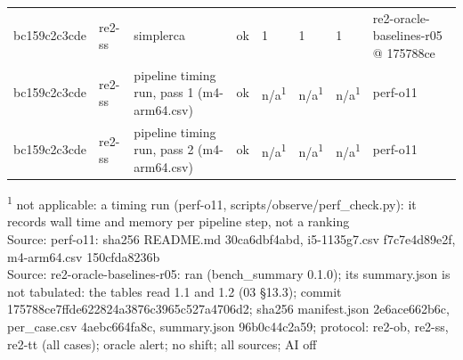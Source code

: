 \begin{table}[t]
\begin{tabular}{llllllll}
bc159c2c3cde & re2-ss & simplerca & ok & 1 & 1 & 1 & re2-oracle-baselines-r05 @ 175788ce \\
bc159c2c3cde & re2-ss & pipeline timing run, pass 1 (m4-arm64.csv) & ok & n/a\textsuperscript{1} & n/a\textsuperscript{1} & n/a\textsuperscript{1} & perf-o11 \\
bc159c2c3cde & re2-ss & pipeline timing run, pass 2 (m4-arm64.csv) & ok & n/a\textsuperscript{1} & n/a\textsuperscript{1} & n/a\textsuperscript{1} & perf-o11 \\
\hline
\end{tabular}
\par\smallskip\footnotesize
\textsuperscript{1} not applicable: a timing run (perf-o11, scripts/observe/perf\_check.py): it records wall time and memory per pipeline step, not a ranking\\
Source: perf-o11: sha256 README.md 30ca6dbf4abd, i5-1135g7.csv f7c7e4d89e2f, m4-arm64.csv 150cfda8236b\\
Source: re2-oracle-baselines-r05: ran (bench\_summary 0.1.0); its summary.json is not tabulated: the tables read 1.1 and 1.2 (03 \S{}13.3); commit 175788ce7ffde622824a3876c3965c527a4706d2; sha256 manifest.json 2e6ace662b6c, per\_case.csv 4aebc664fa8c, summary.json 96b0c44c2a59; protocol: re2-ob, re2-ss, re2-tt (all cases); oracle alert; no shift; all sources; AI off\\
\end{table}

